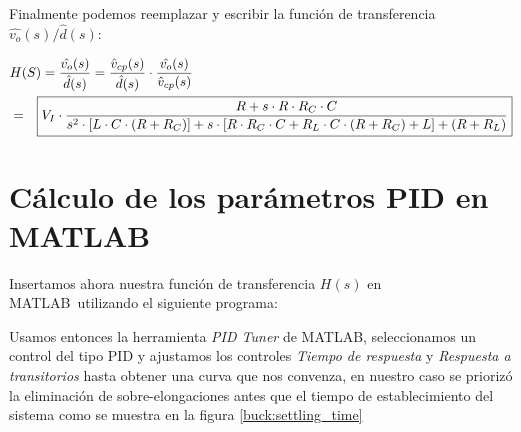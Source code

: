 \documentclass[12pt]{report}
\begin{document}
	Finalmente podemos reemplazar y escribir la función de transferencia $\hat{v_o}(s)/\hat{d}(s)$:
	
	\begin{equation}
	\begin{aligned}
	&H(S) = \dfrac{\hat{v_o}(s)}{\hat{d}(s)} = \dfrac{\hat{v}_{cp}(s)}{\hat{d}(s)} \cdot \dfrac{\hat{v_o}(s)}{\hat{v}_{cp}(s)} \\	
	&=\Aboxed{V_I \cdot \dfrac{R + s \cdot R \cdot R_C \cdot C}{s^2 \cdot [L \cdot C \cdot (R + R_C)] + s \cdot [R \cdot R_C \cdot C + R_L \cdot C \cdot (R + R_C) + L] + (R + R_L)}}
	\end{aligned}
	\end{equation}
	
\section{Cálculo de los parámetros PID en MATLAB\textregistered}


	Insertamos ahora nuestra función de transferencia $H(s)$ en MATLAB\textregistered \ utilizando el siguiente programa: 

	\begin{minipage}{\textwidth}
		
	\end{minipage}
	
	Usamos entonces la herramienta \textit{PID Tuner} de MATLAB\textregistered, seleccionamos un control del tipo PID y ajustamos los controles \textit{Tiempo de respuesta} y \textit{Respuesta a transitorios} hasta obtener una curva que nos convenza, en nuestro caso se priorizó la eliminación de sobre-elongaciones antes que el tiempo de establecimiento del sistema como se muestra en la figura \ref{buck:settling_time}
	
\end{document}
